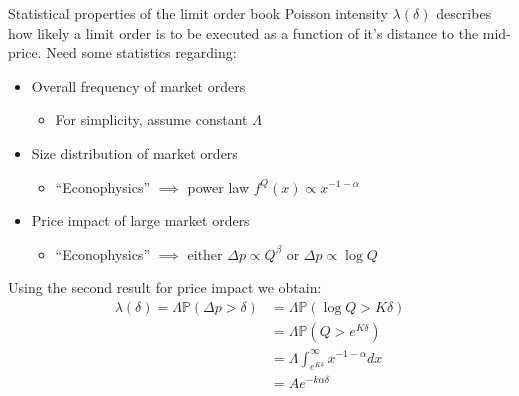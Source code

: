\documentclass{beamer} %
\begin{document}
\begin{frame}{Statistical properties of the limit order book}
    Poisson intensity $\lambda(\delta)$ describes how likely a limit order is to be executed as a function of it's 
    distance to the mid-price. Need some statistics regarding:
    \begin{itemize}
        \item Overall frequency of market orders
        \begin{itemize}
            \item For simplicity, assume constant $\Lambda$
        \end{itemize}
        \item Size distribution of market orders
        \begin{itemize}
            \item ``Econophysics'' $\implies$ power law $f^Q(x)\propto x^{-1-\alpha}$
        \end{itemize}
        \item Price impact of large market orders
        \begin{itemize}
            \item ``Econophysics'' $\implies$ either $\Delta p\propto Q^\beta$ or $\Delta p\propto\log Q$
        \end{itemize}
    \end{itemize}
    Using the second result for price impact we obtain:
    \begin{align*}
        \lambda(\delta)=\Lambda\mathbb{P}(\Delta p>\delta)&=\Lambda\mathbb{P}(\log Q>K\delta)\\
        &=\Lambda\mathbb{P}\left(Q>e^{K\delta}\right)\\
        &=\Lambda\int_{e^{K\delta}}^{\infty}x^{-1-\alpha}dx\\
        &=Ae^{-k\alpha\delta}
    \end{align*}
\end{frame}
\end{document}
